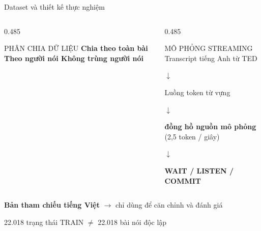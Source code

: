 \documentclass[aspectratio=169,11pt]{beamer}
\begin{document}
\begin{frame}{Dataset và thiết kế thực nghiệm}
\begin{columns}[T,onlytextwidth]
\begin{column}{0.485\textwidth}
\begin{block}{PHÂN CHIA DỮ LIỆU}
        \vspace{0.4em}
        \small\bfseries Chia theo toàn bài \;\textperiodcentered\; Theo người nói \;\textperiodcentered\; Không trùng người nói
      \end{block}
    \end{column}
    \begin{column}{0.485\textwidth}
      \begin{block}{MÔ PHỎNG STREAMING}
        \centering\small
        Transcript tiếng Anh từ TED

        \vspace{-0.15em}
        {\color{TimelyTeal}$\downarrow$}\par
        Luồng token từ vựng

        \vspace{-0.15em}
        {\color{TimelyTeal}$\downarrow$}\par
        \textbf{đồng hồ nguồn mô phỏng} \;\alert{(2,5 token / giây)}

        \vspace{-0.15em}
        {\color{TimelyTeal}$\downarrow$}\par
        \textbf{WAIT / LISTEN / COMMIT}
      \end{block}
    \end{column}
  \end{columns}

  \vspace{0.15em}
  \centering\scriptsize
  \textbf{Bản tham chiếu tiếng Việt} $\rightarrow$ chỉ dùng để căn chỉnh và đánh giá\par
  \vspace{0.15em}
  22.018 trạng thái TRAIN $\neq$ 22.018 bài nói độc lập
\end{frame}
\end{document}
